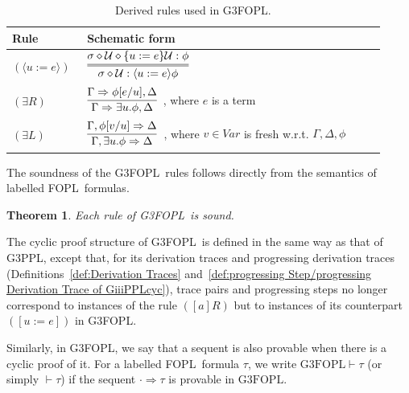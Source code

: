 \documentclass[manuscript,screen]{acmart}
\newtheorem{theorem}{Theorem}[section]
\newcommand{\mcl}[1]{\mathcal{#1}}
\newcommand{\la}[0]{\langle}
\newcommand{\ra}[0]{\rangle}
\newcommand{\Var}[0]{\mathit{Var}}
\newcommand{\cat}[0]{\diamond}
\newcommand{\GiiiPPL}[0]{\mbox{G3PPL}}
\newcommand{\GiiiFOPL}[0]{\mbox{G3FOPL}}
\newcommand{\GiiiFOPLcyc}[0]{\mbox{G3FOPL}}
\newcommand{\upd}[0]{\mcl{U}}
\newcommand{\FOPL}[0]{\mbox{FOPL}}
\begin{document}
\begin{table}[t]
\centering
\small
\begin{tabular}{p{0.18\linewidth}p{0.74\linewidth}}
\toprule
Rule & Schematic form \\
\midrule
$(\la u:=e\ra)$ & $\begin{aligned}\infer=[]{\sigma\cat\upd:\la u:=e\ra\phi}{\sigma\cat\upd\cat\{u:=e\}\upd:\phi}\end{aligned}$\\[1.2em]
$(\exists R)$ & $\begin{aligned}\infer[]{\Gamma\Rightarrow\exists u.\phi,\Delta}{\Gamma\Rightarrow\phi[e/u],\Delta}\end{aligned}$, where $e$ is a term\\[1.2em]
$(\exists L)$ & $\begin{aligned}\infer[]{\Gamma,\exists u.\phi\Rightarrow\Delta}{\Gamma,\phi[v/u]\Rightarrow\Delta}\end{aligned}$, where $v\in\Var$ is fresh w.r.t. $\Gamma,\Delta,\phi$\\
\bottomrule
\end{tabular}
\caption{Derived rules used in \GiiiFOPL.}
\label{table:giiiFOPL-derived-propositional-rules}
\end{table}

The soundness of the \GiiiFOPL\ rules follows directly from the semantics of labelled \FOPL\ formulas.

\begin{theorem}
Each rule of \GiiiFOPL\ is sound.
\end{theorem}

The cyclic proof structure of \GiiiFOPL\ is defined in the same way as that of \GiiiPPL, except that, for its derivation traces and progressing derivation traces (Definitions~\ref{def:Derivation Traces} and~\ref{def:progressing Step/progressing Derivation Trace of GiiiPPLcyc}), trace pairs and progressing steps no longer correspond to instances of the rule $([a]R)$ but to instances of its counterpart $([u:=e])$ in \GiiiFOPL. 

Similarly, in \GiiiFOPL, we say that a sequent is also provable when there is a cyclic proof of it. 
For a labelled \FOPL\ formula $\tau$, we write $\GiiiFOPLcyc\vdash \tau$ (or simply $\vdash \tau$) if the sequent $\cdot \Rightarrow \tau$ is provable in $\GiiiFOPLcyc$. 
\end{document}
